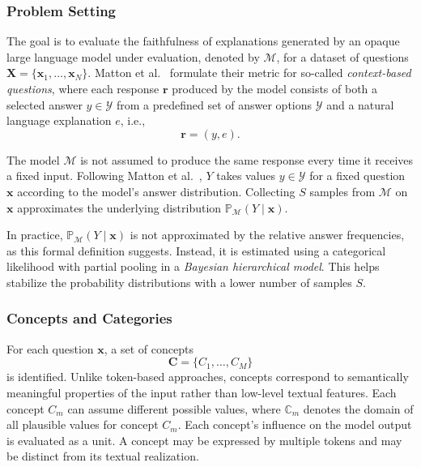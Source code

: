 \subsubsection{Problem Setting}
\label{sec:problem_setting}
The goal is to evaluate the faithfulness of explanations generated by an opaque large language model under evaluation, denoted by $\mathcal{M}$, for a dataset of questions $\mathbf{X}=\{\mathbf{x}_1,\ldots,\mathbf{x}_N\}$. Matton et al.~\cite{mattonWalkTalkMeasuring2024} formulate their metric for so-called \emph{context-based questions}, where each response $\mathbf{r}$ produced by the model consists of both a selected answer $y \in \mathcal{Y}$ from a predefined set of answer options $\mathcal{Y}$ and a natural language explanation $e$, i.e.,
\begin{equation}
	\mathbf{r}=(y,e).
\end{equation}

The model $\mathcal{M}$ is not assumed to produce the same response every time it receives a fixed input. Following Matton et al.~\cite{mattonWalkTalkMeasuring2024}, $Y$ takes values $y\in\mathcal{Y}$ for a fixed question $\mathbf{x}$ according to the model’s answer distribution. Collecting $S$ samples from $\mathcal{M}$ on $\mathbf{x}$ approximates the underlying distribution $\mathbb{P}_{\mathcal{M}}(Y\mid \mathbf{x})$.

In practice, $\mathbb{P}_{\mathcal{M}}(Y\mid\mathbf{x})$ is not approximated by the relative answer frequencies, as this formal definition suggests. Instead, it is estimated using a categorical likelihood with partial pooling in a \emph{Bayesian hierarchical model}. This helps stabilize the probability distributions with a lower number of samples $S$.

\subsubsection{Concepts and Categories}

For each question $\mathbf{x}$, a set of concepts
\begin{equation}
	\mathbf{C}=\{C_1,\ldots,C_M\}
\end{equation}
is identified. Unlike token-based approaches, concepts correspond to semantically meaningful properties of the input rather than low-level textual features. Each concept $C_m$ can assume different possible values, where $\mathbb{C}_m$ denotes the domain of all plausible values for concept $C_m$. Each concept's influence on the model output is evaluated as a unit. A concept may be expressed by multiple tokens and may be distinct from its textual realization.

